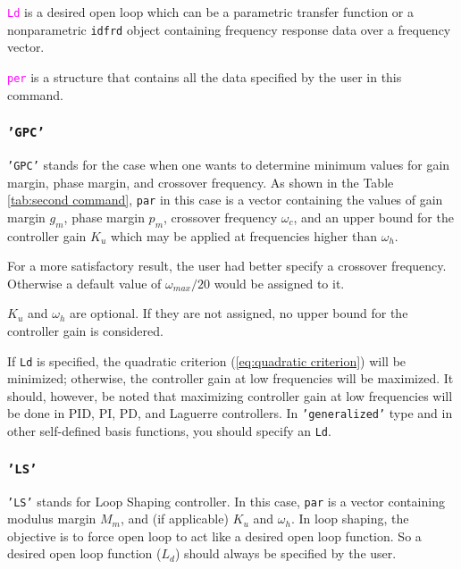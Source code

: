 \documentclass [12pt , a4paper] {article}
\begin{document}
\textcolor{magenta}{\texttt{Ld}} is a desired open loop which can be a parametric transfer function or a nonparametric \texttt{idfrd} object containing frequency response data over a frequency vector. 

\textcolor{magenta}{\texttt{per}} is a structure that contains all the data specified by the user in this command.

\subsubsection{\texttt{'GPC'}} 
\texttt{'GPC'} stands for the case when one wants to determine minimum values for gain margin, phase margin, and crossover frequency. As shown in the Table \ref{tab:second command}, \texttt{par} in this case is a vector containing the values of gain margin $g_m$, phase margin $p_m$, crossover frequency $\omega_c$, and an upper bound for the controller gain $K_u$ which may be applied at frequencies higher than $\omega_h$. 

For a more satisfactory result, the user had better specify a crossover frequency. Otherwise a default value of $\omega_{max}/20$ would be assigned to it. 

$K_u$ and $\omega_h$ are optional. If they are not assigned, no upper bound for the controller gain is considered.

If \texttt{Ld} is specified, the quadratic criterion (\ref{eq:quadratic criterion}) will be minimized; otherwise, the controller gain at low frequencies will be maximized. It should, however, be noted that maximizing controller gain at low frequencies will be done in PID, PI, PD, and Laguerre controllers. In \texttt{'generalized'} type and in other self-defined basis functions, you should specify an \texttt{Ld}.

\subsubsection{\texttt{'LS'}} 
\texttt{'LS'} stands for Loop Shaping controller. In this case, \texttt{par} is a vector containing modulus margin $M_m$, and (if applicable) $K_u$ and $\omega_h$. In loop shaping, the objective is to force open loop to act like a desired open loop function. So a desired open loop function ($L_d$) should always be specified by the user.
\end{document}
